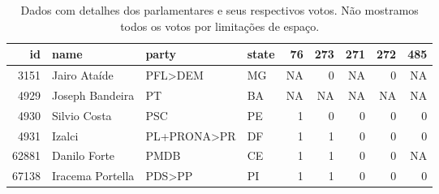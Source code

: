 \documentclass[a4paper,titlepage]{ppgi}\usepackage[]{graphicx}\usepackage[]{color}
\newenvironment{knitrout}{}{} %
\begin{document}
\begin{table}
\centering
\begin{knitrout}
\color{fgcolor}
\begin{tabular}{r|l|l|l|r|r|r|r|r}
\hline
id & name & party & state & 76 & 273 & 271 & 272 & 485\\
\hline
3151 & Jairo Ataíde & PFL>DEM & MG & NA & 0 & NA & 0 & NA\\
\hline
4929 & Joseph Bandeira & PT & BA & NA & NA & NA & NA & NA\\
\hline
4930 & Silvio Costa & PSC & PE & 1 & 0 & 0 & 0 & 0\\
\hline
4931 & Izalci & PL+PRONA>PR & DF & 1 & 1 & 0 & 0 & 0\\
\hline
62881 & Danilo Forte & PMDB & CE & 1 & 1 & 0 & 0 & NA\\
\hline
67138 & Iracema Portella & PDS>PP & PI & 1 & 1 & 0 & 0 & 0\\
\hline
\end{tabular}


\end{knitrout}
\caption{Dados com detalhes dos parlamentares e seus respectivos votos. Não
mostramos todos os votos por limitações de espaço.}
\label{table:votes}
\end{table}
\end{document}
